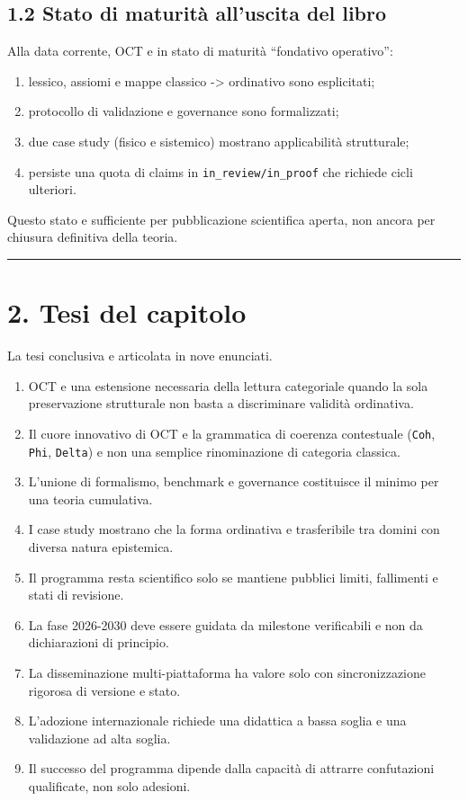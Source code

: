 \subsection{1.2 Stato di maturità all'uscita del libro}

Alla data corrente, OCT e in stato di maturità ``fondativo operativo'':

\begin{enumerate}
\def\labelenumi{\arabic{enumi}.}
\tightlist
\item
  lessico, assiomi e mappe classico -\textgreater{} ordinativo sono esplicitati;
\item
  protocollo di validazione e governance sono formalizzati;
\item
  due case study (fisico e sistemico) mostrano applicabilità strutturale;
\item
  persiste una quota di claims in \texttt{in\_review/in\_proof} che richiede cicli ulteriori.
\end{enumerate}

Questo stato e sufficiente per pubblicazione scientifica aperta, non ancora per chiusura definitiva della teoria.

\begin{center}\rule{0.5\linewidth}{0.5pt}\end{center}

\section{2. Tesi del capitolo}

La tesi conclusiva e articolata in nove enunciati.

\begin{enumerate}
\def\labelenumi{\arabic{enumi}.}
\tightlist
\item
  OCT e una estensione necessaria della lettura categoriale quando la sola preservazione strutturale non basta a discriminare validità ordinativa.
\item
  Il cuore innovativo di OCT e la grammatica di coerenza contestuale (\texttt{Coh}, \texttt{Phi}, \texttt{Delta}) e non una semplice rinominazione di categoria classica.
\item
  L'unione di formalismo, benchmark e governance costituisce il minimo per una teoria cumulativa.
\item
  I case study mostrano che la forma ordinativa e trasferibile tra domini con diversa natura epistemica.
\item
  Il programma resta scientifico solo se mantiene pubblici limiti, fallimenti e stati di revisione.
\item
  La fase 2026-2030 deve essere guidata da milestone verificabili e non da dichiarazioni di principio.
\item
  La disseminazione multi-piattaforma ha valore solo con sincronizzazione rigorosa di versione e stato.
\item
  L'adozione internazionale richiede una didattica a bassa soglia e una validazione ad alta soglia.
\item
  Il successo del programma dipende dalla capacità di attrarre confutazioni qualificate, non solo adesioni.
\end{enumerate}

